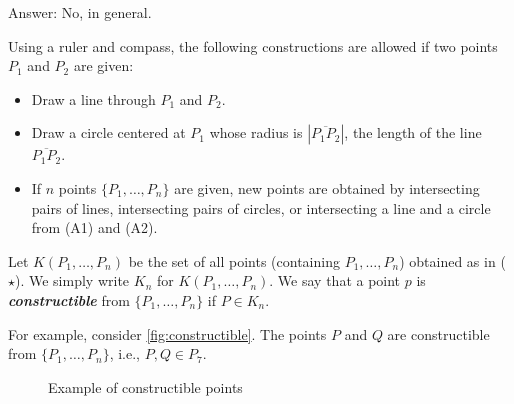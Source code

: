 \documentclass[twoside]{article}
\theoremstyle{remark}
\newcommand*\term[1]{\textbf{\textit{\mathversion{bold}#1}}}
\begin{document}
Answer: No, in general.

Using a ruler and compass, the following constructions are allowed if two points \(P_1\) and \(P_2\) are given:
\begin{itemize}[nosep]
  \item[(A1)] Draw a line through \(P_1\) and \(P_2\).
  \item[(A2)] Draw a circle centered at \(P_1\) whose radius is \(|\overline{P_1P_2}|\), the length of the line \(\overline{P_1P_2}\).
  \item[(\(\star\))] If \(n\) points \(\{P_1, \dots, P_n\}\) are given, new points are obtained by intersecting pairs of lines, intersecting pairs of circles, or intersecting a line and a circle from (A1) and (A2).
\end{itemize}
Let \(K(P_1, \dots, P_n)\) be the set of all points (containing \(P_1, \dots, P_n\)) obtained as in (\(\star\)). We simply write \(K_n\) for \(K(P_1, \dots, P_n)\). We say that a point \(p\) is \term{constructible} from \(\{P_1, \dots, P_n\}\) if \(P \in K_n\).

For example, consider \autoref{fig:constructible}. The points \(P\) and \(Q\) are constructible from \(\{P_1, \dots, P_n\}\), i.e., \(P,Q \in P_7\).
\begin{figure}\centering
  \caption{Example of constructible points}\label{fig:constructible}
\end{figure}
\end{document}
